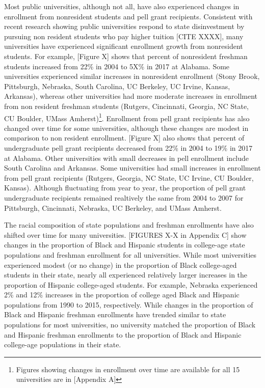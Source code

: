 \documentclass[twoside]{article}
\begin{document}
Most public universities, although not all, have also experienced changes in enrollment from nonresident students and pell grant recipients. Consistent with recent research showing public universities respond to state disinvestment by pursuing non resident students who pay higher tuition [CITE XXXX], many universities have experienced significant enrollment growth from nonresident students. For example, [Figure X] shows that percent of nonresident freshman students increased from 22\% in 2004 to 5X\% in 2017 at Alabama. Some universities experienced similar increases in nonresident enrollment (Stony Brook, Pittsburgh, Nebraska, South Carolina, UC Berkeley, UC Irvine, Kansas, Arkansas), whereas other universities had more moderate increases in enrollment from non resident freshman students (Rutgers, Cincinnati, Georgia, NC State, CU Boulder, UMass Amherst)\footnote{Figures showing changes in enrollment over time are available for all 15 universities are in [Appendix A]}. Enrollment from pell grant recipients has also changed over time for some universities, although these changes are modest in comparison to non resident enrollment. [Figure X] also shows that percent of undergraduate pell grant recipients decreased from 22\% in 2004 to 19\% in 2017 at Alabama. Other universities with small decreases in pell enrollment include South Carolina and Arkansas.  Some universities had small increases in enrollment from pell grant recipients (Rutgers, Georgia, NC State, UC Irvine, CU Boulder, Kansas). Although fluctuating from year to year, the proportion of pell grant undergraduate recipients remained realtively the same from 2004 to 2007 for Pittsburgh, Cincinnati, Nebraska, UC Berkeley, and UMass Amherst. 

The racial composition of state populations and freshman enrollments have also shifted over time for many universities. [FIGURES X-X in Appendix C] show changes in the proportion of Black and Hispanic students in college-age state populations and freshman enrollment for all universities. While most universities experienced modest (or no change) in the proportion of Black college-aged students in their state, nearly all experienced relatively larger increases in the proportion of Hispanic college-aged students. For example, Nebraska experienced 2\% and 12\% increases in the proportion of college aged Black and Hispanic populations from 1990 to 2015, respectively. While changes in the proportion of Black and Hispanic freshman enrollments have trended similar to state populations for most universities, no university matched the proportion of Black and Hispanic freshman enrollments to the proportion of Black and Hispanic college-age populations in their state.  
\end{document}
